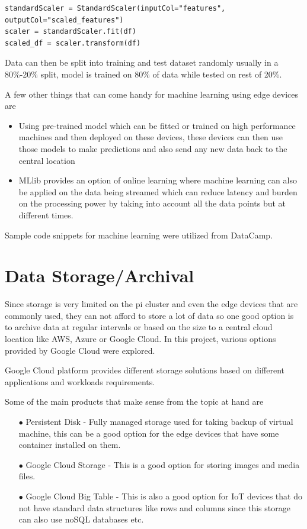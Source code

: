 \begin{verbatim}
standardScaler = StandardScaler(inputCol="features", outputCol="scaled_features")
scaler = standardScaler.fit(df)
scaled_df = scaler.transform(df)
\end{verbatim}
Data can then be split into training and test dataset randomly usually in a 80\%-20\% split, model is trained on 80\% of data while tested on rest of 20\%. 

A few other things that can come handy for machine learning using edge devices are
\begin{itemize}
\item Using pre-trained model which can be fitted or trained on high performance machines and then deployed on these devices, these devices can then use those models to make predictions and also send any new data back to the central location
\item MLlib provides an option of online learning where machine learning can also be applied on the data being streamed which can reduce latency and burden on the processing power by taking into account all the data points but at different times.
\end{itemize}

Sample code snippets for machine learning were utilized from DataCamp\cite{hid-sp18-510-dc}. 

\section{Data Storage/Archival}
Since storage is very limited on the pi cluster and even the edge devices that are commonly used, they can not afford to store a lot of data so one good option is to archive data at regular intervals or based on the size to a central cloud location like AWS, Azure or Google Cloud. In this project, various options provided by Google Cloud were explored.

Google Cloud platform provides different storage solutions based on different applications and workloads requirements. 

Some of the main products that make sense from the topic at hand are

\begin{itemize}
\item[$\bullet$] Persistent Disk - Fully managed storage used for taking backup of virtual machine, this can be a good option for the edge devices that have some container installed on them.
\item[$\bullet$] Google Cloud Storage - This is a good option for storing images and media files.
\item[$\bullet$] Google Cloud Big Table - This is also a good option for IoT devices that do not have standard data structures like rows and columns since this storage can also use noSQL databases etc.
\end{itemize} 

